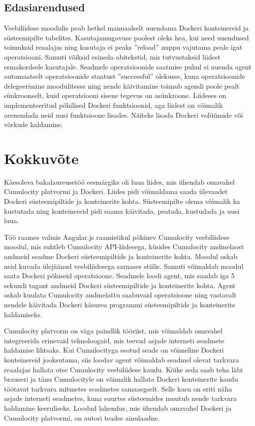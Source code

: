 \documentclass[12pt]{article}
\begin{document}
 
  \subsection{Edasiarendused}
  Veebiliidese moodulis peab hetkel manuaalselt uuendama Dockeri konteinereid ja süsteemipilte
  tabelites. Kasutajamugavuse poolest oleks hea, kui need uuendused toimuksid reaalajas ning
  kasutaja ei peaks ''reload'' nuppu vajutama peale igat operatsiooni. Samuti võiksid esineda
  abitekstid, mis tutvustaksid liidest esmakordsele kasutajale.
  Seadmele operatsioonide
  saatmise puhul ei uuenda agent automaatselt operatsioonide staatust ''successful'' olekusse,
  kuna operatsioonide delegeerimine moodulitesse ning nende käivitamine toimub agendi poole pealt
  sünkroonselt, kuid operatsiooni sisene tegevus on asünkroone.
  Liideses on implementeeritud põhilised Dockeri funktsioonid, aga liidest on võimalik arenendada
  neid uusi funktsioone lisades. Näiteks lisada Dockeri volüümide või võrkude haldamine.
 
 
 
 
 
 
 
 
 
  \clearpage
  \section{Kokkuvõte}
  Käesoleva bakalaureusetöö eesmärgiks oli luua liides, mis ühendab omavahel Cumulocity platvormi
  ja Dockeri. Liides pidi võimaldama saada ülevaadet Dockeri süsteemipiltide ja konteinerite kohta.
  Süsteemipilte olema võimalik ka kustutada ning konteinereid pidi saama käivitada, peatada, kustudada
  ja uusi luua. 
 
  Töö raames valmis Angular.js raamistikul põhinev Cumulocity veebiliidese moodul, mis suhtleb Cumulocity
  API-liidesega, küsides Cumulocity andmelaost andmeid seadme Dockeri süsteemipiltide ja konteinerite kohta.
  Moodul oskab neid kuvada ülejäänud veebiliidesega sarnases stiilis. Samuti võimaldab moodul
  saata Dockeri põhiseid operatsioone.
  Seadmele loodi agent, mis saadab iga 5 sekundi tagant andmeid Dockeri süsteemipiltide ja konteinerite kohta.
  Agent oskab kuulata Cumulocity andmelattu saabuvaid operatsioone ning vastavalt nendele
  käivitada Dockeri käsurea programmi süsteemipiltide ja konteinerite haldamiseks.
 
  Cumulocity platvorm on väga paindlik tööriist, mis võimaldab omavahel integreerida erinevaid
  tehnoloogaid, mis teevad asjade interneti seadmete haldamise lihtsaks. Kui Cumulocityga seotud seade on võimeline
  Dockeri konteinereid jooksutama, siis loodav agent võimaldab seadmel olevat tarkvara reaalajas hallata otse
  Cumulocity veebiliidese kaudu. Kõike seda saab teha läbi brauseri ja tänu Cumulocityle on võimalik hallata
  Dockeri konteinerite kaudu töötavat tarkvara mitmetes seadmetes samaaegselt. Selle kasu on eriti näha
  asjade interneti seadmetes, kuna suurtes süsteemides muutub nende tarkvara haldamine keeruliseks.
  Loodud lahendus, mis ühendab omavahel Dockeri ja Cumulocity platvormi, on autori teades ainulaadne.
 
\end{document}
